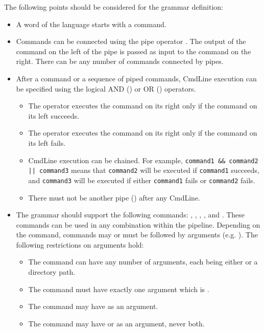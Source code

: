 \documentclass[10pt, a4paper]{article}
\begin{document}
The following points should be considered for the grammar definition:
\begin{itemize}
    \item A word of the language starts with a command.
    \item Commands can be connected using the pipe operator \terminal{|}. The output of the command on the left of the pipe is passed as input to the command on the right. There can be any number of commands connected by pipes.
    \item After a command or a sequence of piped commands, CmdLine execution can be specified using the logical AND (\terminal{\&\&}) or OR (\terminal{||}) operators.
    \begin{itemize}
        \item The operator \terminal{\&\&} executes the command on its right only if the command on its left succeeds.
        \item The operator \terminal{||} executes the command on its right only if the command on its left fails.
        \item CmdLine execution can be chained. For example, \texttt{command1 \&\& command2 || command3} means that \texttt{command2} will be executed if \texttt{command1} succeeds, and \texttt{command3} will be executed if either \texttt{command1} fails or \texttt{command2} fails.
        \item There must not be another pipe (\terminal{|}) after any CmdLine.
    \end{itemize}
    \item The grammar should support the following commands: , , , , and . These commands can be used in any combination within the pipeline. Depending on the command, commands may or must be followed by arguments (e.g.  ). The following restrictions on arguments hold:
    \begin{itemize}
        \item The  command can have any number of arguments, each being either  or a directory path.
        \item The  command must have exactly one argument which is . 
        \item The  command may have  as an argument.
        \item The  command may have  or  as an argument, never both.

\end{itemize}
\end{itemize}
\end{document}

